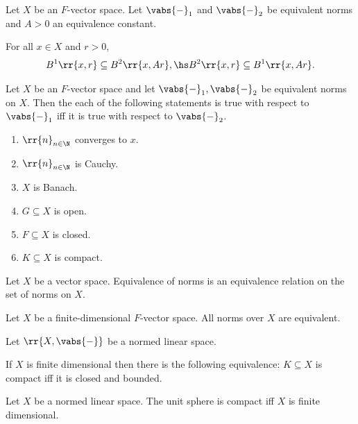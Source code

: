 \documentclass{article}
\begin{document}
\begin{lemma}
  Let $X$ be an $F$-vector space. Let $\vabs{-}_{1}$ and $\vabs{-}_{2}$ be equivalent norms
  and $A>0$ an equivalence constant.

  For all $x\in X$ and $r>0$,
  \begin{align*}
    B^1\rr{x,r}\subseteq B^2\rr{x,Ar}, \hs
    B^2\rr{x,r}\subseteq B^1\rr{x,Ar}.
  \end{align*}
\end{lemma}

\begin{lemma}
  Let $X$ be an $F$-vector space and let $\vabs{-}_{1},\vabs{-}_{2}$ be equivalent norms
  on $X$. Then the each of the following statements is true with respect to $\vabs{-}_{1}$ iff it is true with respect to $\vabs{-}_{2}$.
  \begin{enumerate}
    \item $\rr{n}_{n\in\N}$ converges to $x$.
    \item $\rr{n}_{n\in\N}$ is Cauchy.
    \item $X$ is Banach.
    \item $G\subseteq X$ is open.
    \item $F\subseteq X$ is closed.
    \item $K\subseteq X$ is compact.
  \end{enumerate}
\end{lemma}

\begin{lemma}
  Let $X$ be a vector space. Equivalence of norms is an equivalence relation on the set of
  norms on $X$.
\end{lemma}

\begin{theorem}
  Let $X$ be a finite-dimensional $F$-vector space. All norms over $X$ are equivalent.
\end{theorem}

\begin{theorem}
  Let $\rr{X, \vabs{-}}$ be a normed linear space.

  If $X$ is finite dimensional then there is the following equivalence: $K\subseteq X$
  is compact iff it is closed and bounded.
\end{theorem}

\begin{theorem}
  Let $X$ be a normed linear space. The unit sphere is compact iff $X$ is finite dimensional.
\end{theorem}
\end{document}
